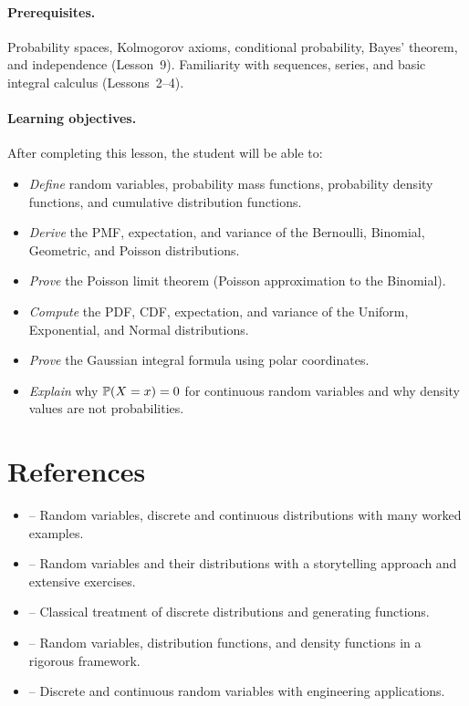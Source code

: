 \documentclass[11pt,a4paper]{article}
\begin{document}
\paragraph{Prerequisites.}
Probability spaces, Kolmogorov axioms, conditional probability, Bayes'
theorem, and independence (Lesson~9). Familiarity with sequences, series,
and basic integral calculus (Lessons~2--4).

\paragraph{Learning objectives.}
After completing this lesson, the student will be able to:
\begin{itemize}
    \item \emph{Define} random variables, probability mass functions,
    probability density functions, and cumulative distribution functions.
    \item \emph{Derive} the PMF, expectation, and variance of the
    Bernoulli, Binomial, Geometric, and Poisson distributions.
    \item \emph{Prove} the Poisson limit theorem (Poisson approximation to
    the Binomial).
    \item \emph{Compute} the PDF, CDF, expectation, and variance of the
    Uniform, Exponential, and Normal distributions.
    \item \emph{Prove} the Gaussian integral formula using polar
    coordinates.
    \item \emph{Explain} why $\mathbb{P}(X = x) = 0$ for continuous random
    variables and why density values are not probabilities.
\end{itemize}


\section{References}
\label{sec:references}

\begin{itemize}
    \item \citet[Chapters 3--5]{ross2019} -- Random variables, discrete
    and continuous distributions with many worked examples.
    \item \citet[Chapters 3--5]{blitzstein2019} -- Random variables and
    their distributions with a storytelling approach and extensive
    exercises.
    \item \citet[Chapters 2--4]{feller1968} -- Classical treatment of
    discrete distributions and generating functions.
    \item \citet[Chapter 2]{grimmett2020} -- Random variables, distribution
    functions, and density functions in a rigorous framework.
    \item \citet[Chapter 2]{bertsekas2008} -- Discrete and continuous
    random variables with engineering applications.
\end{itemize}
\end{document}
